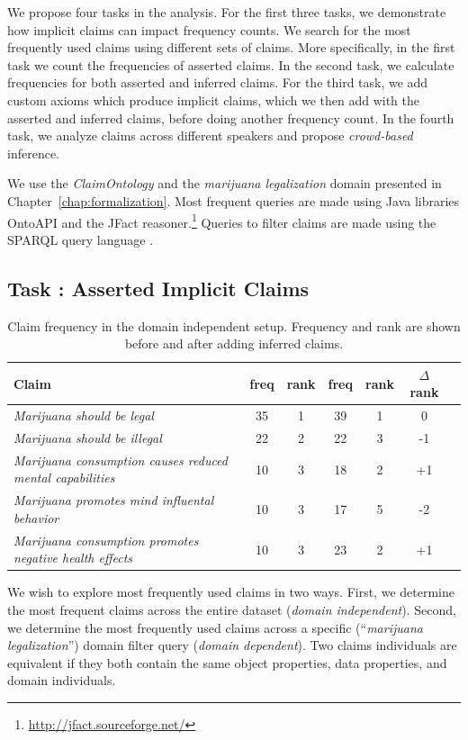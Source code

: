 We propose four tasks in the analysis. For the first three tasks, 
we demonstrate how implicit claims can impact frequency counts.
We search for the most frequently used claims using different sets
of claims. More specifically, in the first task we count 
the frequencies of asserted claims. In the second task, we 
calculate frequencies for both asserted and inferred
claims. For the third task, we add custom axioms which produce implicit claims,
which we then add with the asserted and inferred claims, before
doing another frequency count. In the fourth task, we analyze claims
across different speakers and propose \emph{crowd-based} inference.

We use the \emph{ClaimOntology} and the \emph{marijuana legalization} domain
presented in Chapter~\ref{chap:formalization}. Most frequent queries 
are made using Java libraries OntoAPI \citep{bellatreche2007ontoapi} and 
the JFact reasoner.\footnote{\url{http://jfact.sourceforge.net/}}
Queries to filter claims are made using the SPARQL query language
\citep{perez2006semantics}.

\subsection{Task : Asserted Implicit Claims}

\begin{table}[t]
\centering
\begin{tabular}{p{9 cm} | cc | cc | cc}
	\toprule
	\textbf{Claim} & freq & rank & freq & rank & $\Delta$rank \\
\midrule
	\emph{Marijuana should be legal 				}& 35 & 1 & 39 & 1 & 0 \\
	\emph{Marijuana should be illegal 				}& 22 & 2 & 22 & 3 & -1 \\
	\emph{Marijuana consumption causes reduced mental capabilities} & 10 & 3 & 18 & 2 & +1 \\
	\emph{Marijuana promotes mind influental behavior 		}& 10 & 3 & 17 & 5 & -2 \\
	\emph{Marijuana consumption promotes negative health effects 	}& 10 & 3 & 23 & 2 & +1 \\
\bottomrule 
\end{tabular}
\caption{Claim frequency in the domain independent setup. Frequency and rank are
	shown before and after adding inferred claims. }
\label{tab:claim_freq_indep}
\end{table}

We wish to explore most frequently used claims in two ways.
First, we determine the most frequent claims across the entire dataset
(\emph{domain independent}).
Second, we determine the most frequently used claims across a specific 
(``\emph{marijuana legalization}'') domain filter query
(\emph{domain dependent}). 
Two claims individuals are equivalent if they both contain the same
object properties, data properties, and domain individuals. 

